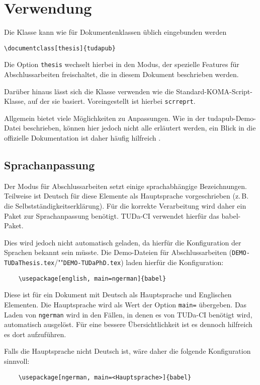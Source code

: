 \documentclass[
	ngerman,
	ruledheaders=section,%
	class=report,%
	thesis={type=bachelor},%
	accentcolor=9c,%
	custommargins=true,%
	marginpar=false,%
	parskip=half-,%
	fontsize=11pt,%
]{tudapub}
\let\file\texttt
\let\code\texttt
\begin{document}
\chapter{Verwendung}
Die Klasse kann wie für Dokumentenklassen üblich eingebunden werden
\begin{verbatim}
\documentclass[thesis]{tudapub}
\end{verbatim}
Die Option \code{thesis} wechselt hierbei in den Modus, der spezielle Features für Abschlussarbeiten freischaltet, die in diesem Dokument beschrieben werden.

Darüber hinaus lässt sich die Klasse verwenden wie die Standard-KOMA-Script-Klasse, auf der sie basiert.
Voreingestellt ist hierbei \code{scrreprt}.

Allgemein bietet \KOMAScript{} viele Möglichkeiten zu Anpassungen. Wie in der tudapub-Demo-Datei beschrieben, können hier jedoch nicht alle erläutert werden, ein Blick in die offizielle Dokumentation ist daher häufig hilfreich \cite{scrguide}.

\section{Sprachanpassung}
Der Modus für Abschlussarbeiten setzt einige sprachabhängige Bezeichnungen.
Teilweise ist Deutsch für diese Elemente als Hauptsprache vorgeschrieben (z.\,B. die Selbstständigkeitserklärung). Für die korrekte Verarbeitung wird daher ein Paket zur Sprachanpassung benötigt.
TUDa-CI verwendet hierfür das babel-Paket.

Dies wird jedoch nicht automatisch geladen, da hierfür die Konfiguration der Sprachen bekannt sein müsste. Die Demo-Dateien für Abschlussarbeiten (\file{DEMO-TUDaThesis.tex}/""\file{DEMO-TUDaPhD.tex}) laden hierfür die Konfiguration:
\begin{verbatim}
	\usepackage[english, main=ngerman]{babel}
\end{verbatim}
Diese ist für ein Dokument mit Deutsch als Hauptsprache und Englischen Elementen.
Die Hauptsprache wird als Wert der Option \verb+main=+ übergeben.
Das Laden von \verb+ngerman+ wird in den Fällen, in denen es von TUDa-CI benötigt wird, automatisch ausgelöst.
Für eine bessere Übersichtlichkeit ist es dennoch hilfreich es dort aufzuführen.

Falls die Hauptsprache nicht Deutsch ist, wäre daher die folgende Konfiguration sinnvoll:
\begin{verbatim}
	\usepackage[ngerman, main=<Hauptsprache>]{babel}
\end{verbatim}
\end{document}
